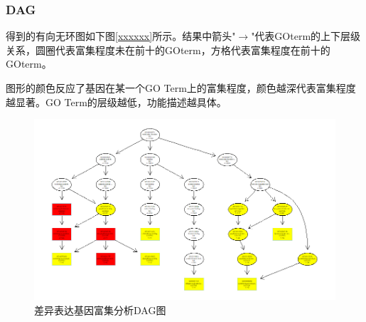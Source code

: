 \documentclass{article}
\begin{document}
\subsubsection{DAG}
得到的有向无环图如下图\ref{xxxxxx}所示。结果中箭头"$\rightarrow$"代表GO\quad term的上下层级关系，圆圈代表富集程度未在前十的GO\quad term，方格代表富集程度在前十的GO\quad term。\par
图形的颜色反应了基因在某一个GO Term上的富集程度，颜色越深代表富集程度越显著。GO Term的层级越低，功能描述越具体。
\begin{figure}[H]
  \centering
  \includegraphics[scale=0.5]{./picture/Rplot.png} %
  \caption{差异表达基因富集分析DAG图} %
  \label{xxxxxxx} %
\end{figure}
\end{document}
